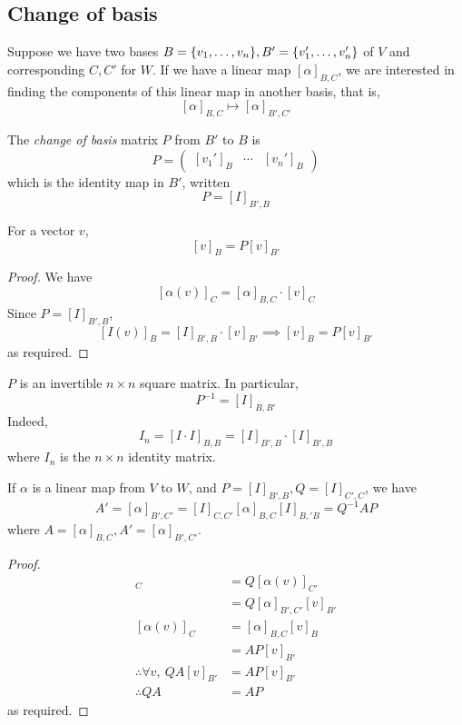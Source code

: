 \subsection{Change of basis}
Suppose we have two bases \( B = \qty{v_1, \dots, v_n}, B' = \qty{v_1', \dots, v_n'} \) of \( V \) and corresponding \( C, C' \) for \( W \).
If we have a linear map \( [\alpha]_{B,C} \), we are interested in finding the components of this linear map in another basis, that is,
\[
	[\alpha]_{B,C} \mapsto [\alpha]_{B',C'}
\]
\begin{definition}
	The \textit{change of basis} matrix \( P \) from \( B' \) to \( B \) is
	\[
		P = \begin{pmatrix}
			[v_1']_B & \cdots & [v_n']_B
		\end{pmatrix}
	\]
	which is the identity map in \( B' \), written
	\[
		P = [I]_{B', B}
	\]
\end{definition}
\begin{lemma}
	For a vector \( v \),
	\[
		[v]_B = P [v]_{B'}
	\]
\end{lemma}
\begin{proof}
	We have
	\[
		[\alpha(v)]_C = [\alpha]_{B,C} \cdot [v]_C
	\]
	Since \( P = [I]_{B', B} \),
	\[
		[I(v)]_B = [I]_{B', B} \cdot [v]_{B'} \implies [v]_B = P[v]_{B'}
	\]
	as required.
\end{proof}
\begin{remark}
	\( P \) is an invertible \( n \times n \) square matrix.
	In particular,
	\[
		P^{-1} = [I]_{B,B'}
	\]
	Indeed,
	\[
		I_n = [I \cdot I]_{B,B} = [I]_{B',B} \cdot [I]_{B',B}
	\]
	where \( I_n \) is the \( n \times n \) identity matrix.
\end{remark}
\begin{proposition}
	If \( \alpha \) is a linear map from \( V \) to \( W \), and \( P = [I]_{B',B}, Q = [I]_{C',C} \), we have
	\[
		A' = [\alpha]_{B',C'} = [I]_{C,C'}[\alpha]_{B,C}[I]_{B,'B} = Q^{-1}AP
	\]
	where \( A = [\alpha]_{B,C}, A' = [\alpha]_{B',C'} \).
\end{proposition}
\begin{proof}
	\begin{align*}
		[\alpha(v)]_C                     & = Q [\alpha(v)]_{C'}          \\
		                                  & = Q [\alpha]_{B',C'} [v]_{B'} \\
		[\alpha(v)]_C                     & = [\alpha]_{B,C} [v]_B        \\
		                                  & = AP[v]_{B'}                  \\
		\therefore \forall v,\ QA[v]_{B'} & = AP[v]_{B'}                  \\
		\therefore QA                     & = AP
	\end{align*}
	as required.
\end{proof}

